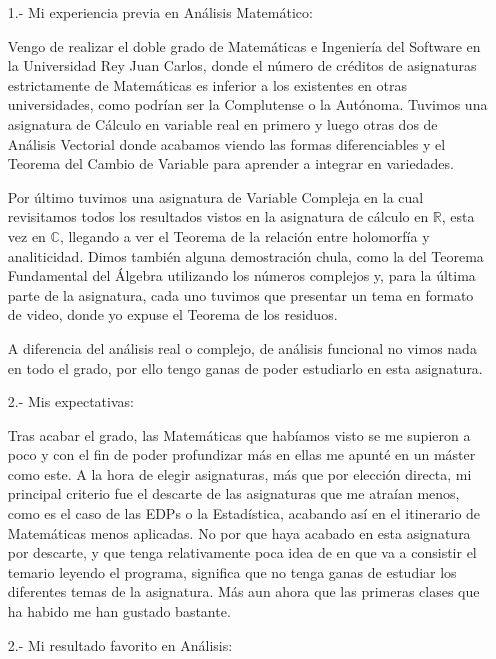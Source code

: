 \documentclass[a4paper,oneside,11pt,leqno]{article}
\begin{document}
\begin{enumerate}

\item[1.-] {  Mi experiencia previa en Análisis Matemático}: 

Vengo de realizar el doble grado de Matemáticas  e Ingeniería del Software en la Universidad Rey Juan Carlos, donde el número de créditos de asignaturas estrictamente de Matemáticas es inferior a los existentes en otras universidades, como podrían ser la Complutense o la Autónoma. Tuvimos una asignatura de Cálculo en variable real en primero y luego otras dos de Análisis Vectorial donde acabamos viendo las formas diferenciables y el Teorema del Cambio de Variable para aprender a integrar en variedades.

Por último tuvimos una asignatura de Variable Compleja en la cual revisitamos todos los resultados vistos en la asignatura de cálculo en $ \mathbb{R} $, esta vez en $ \mathbb{C} $, llegando a ver el Teorema de la relación entre holomorfía y analiticidad. Dimos también alguna demostración chula, como la del Teorema Fundamental del Álgebra utilizando los números complejos y, para la última parte de la asignatura, cada uno tuvimos que presentar un tema en formato de video, donde yo expuse el Teorema de los residuos.

A diferencia del análisis real o complejo, de análisis funcional no vimos nada en todo el grado, por ello tengo ganas de poder estudiarlo en esta asignatura.

\item[2.-] { Mis expectativas}:

Tras acabar el grado, las Matemáticas que habíamos visto se me supieron a poco y con el fin de poder profundizar más en ellas me apunté en un máster como este. A la hora de elegir asignaturas, más que por elección directa, mi principal criterio fue el descarte de las asignaturas que me atraían menos, como es el caso de las EDPs o la Estadística, acabando así en el itinerario de Matemáticas menos aplicadas. No por que haya acabado en esta asignatura por descarte, y que tenga relativamente poca idea de en que va a consistir el temario leyendo el programa, significa que no tenga ganas de estudiar los diferentes temas de la asignatura. Más aun ahora que las primeras clases que ha habido me han gustado bastante.

\item[2.-] { Mi resultado favorito en Análisis}:


\end{enumerate}
\end{document}
